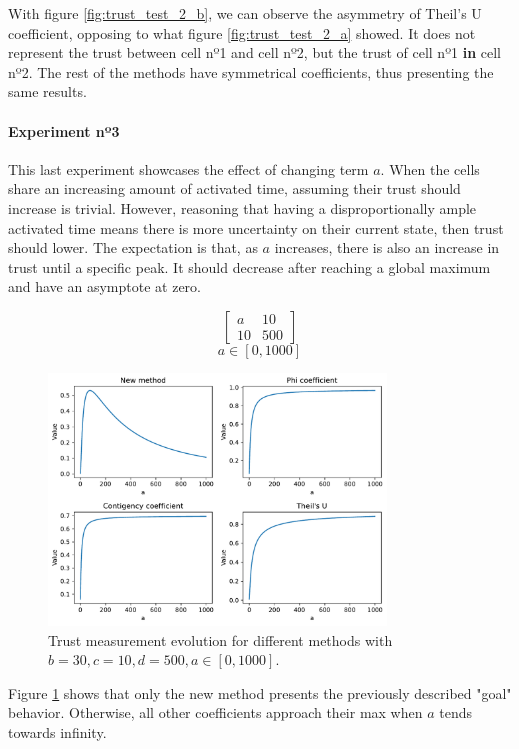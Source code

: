 With figure \ref{fig:trust_test_2_b}, we can observe the asymmetry of Theil's U coefficient, opposing to what figure \ref{fig:trust_test_2_a} showed. It does not represent the trust between cell nº1 and cell nº2, but the trust of cell nº1 \textbf{in} cell nº2. The rest of the methods have symmetrical coefficients, thus presenting the same results.

\paragraph{Experiment nº3} This last experiment showcases the effect of changing term $a$. When the cells share an increasing amount of activated time, assuming their trust should increase is trivial. However, reasoning that having a disproportionally ample activated time means there is more uncertainty on their current state, then trust should lower. The expectation is that, as $a$ increases, there is also an increase in trust until a specific peak. It should decrease after reaching a global maximum and have an asymptote at zero.

$$
\begin{bmatrix}
    a & 10 \\ 10 & 500
\end{bmatrix}
$$
$$
a \in [0, 1000]
$$

\begin{figure}[h!]
\centering
    \includegraphics[width=0.8\textwidth]{figures/chapter4/cell/trust_tests/3.pdf}
    \caption{Trust measurement evolution for different methods with $b=30, c=10, d=500, a \in [0, 1000]$.}
    \label{fig:trust_test_3}
\end{figure}
\FloatBarrier

Figure \ref{fig:trust_test_3} shows that only the new method presents the previously described "goal" behavior. Otherwise, all other coefficients approach their max when $a$ tends towards infinity.

